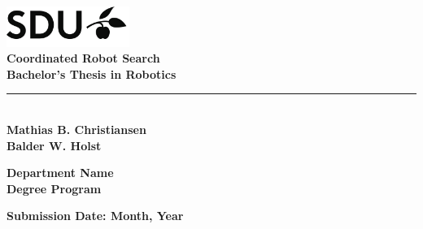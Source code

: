 \begin{titlepage}
    \includegraphics[width=0.3\textwidth]{figures/sdu_logo.png} \\[1cm]

    {\Huge \textbf{Coordinated Robot Search}} \\[0.5cm]
    {\Large \textbf{Bachelor's Thesis in Robotics}} \\[3mm]
    \noindent\rule{\textwidth}{1pt} \\[15mm]
    {\Large \textbf{Mathias B. Christiansen}} \\
    {\Large \textbf{Balder W. Holst}}

    \vfill


    {\large
        \textbf{Department Name} \\
        \textbf{Degree Program} \\[2cm]
    }

    {\large
        \textbf{Submission Date: Month, Year}
    }

\end{titlepage}
